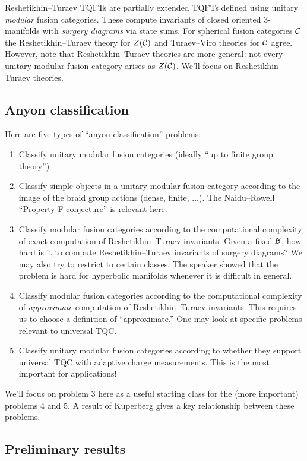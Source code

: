 \documentclass{amsart}
\begin{document}
Reshetikhin--Turaev TQFTs are partially extended TQFTs defined using unitary \emph{modular} fusion categories.
These compute invariants of closed oriented $3$-manifolds with \emph{surgery diagrams} via state sums.
For spherical fusion categories $\mathcal{C}$ the Reshetikhin--Turaev theory for $Z(\mathcal{C})$ and Turaev--Viro theories for $\mathcal{C}$ agree.
However, note that Reshetikhin--Turaev theories are more general: not every unitary modular fusion category arises as $Z(\mathcal{C})$.
We'll focus on Reshetikhin--Turaev theories.

\subsection{Anyon classification}

Here are five types of ``anyon classification'' problems:
\begin{enumerate}
  \item Classify unitary modular fusion categories (ideally ``up to finite group theory'')
  \item Classify simple objects in a unitary modular fusion category according to the image of the braid group actions (dense, finite, ...).
    The Naidu--Rowell ``Property F conjecture'' is relevant here.
  \item Classify modular fusion categories according to the computational complexity of exact computation of Reshetikhin--Turaev invariants.
    Given a fixed $\mathcal{B}$, how hard is it to compute Reshetikhin--Turaev invariants of surgery diagrams?
    We may also try to restrict to certain classes.
    The speaker showed that the problem is hard for hyperbolic manifolds whenever it is difficult in general.
  \item Classify modular fusion categories according to the computational complexity of \emph{approximate} computation of Reshetikhin--Turaev invariants.
    This requires us to choose a definition of ``approximate.''
    One may look at specific problems relevant to universal TQC.
  \item Classify unitary modular fusion categories according to whether they support universal TQC with adaptive charge measurements.
    This is the most important for applications!
\end{enumerate}

We'll focus on problem 3 here as a useful starting class for the (more important) problems 4 and 5.
A result of Kuperberg gives a key relationship between these problems.

\subsection{Preliminary results}
\end{document}
